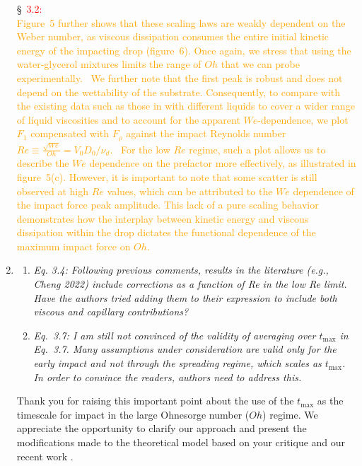 \documentclass[]{article}
\newcommand*\red{\textcolor{red}}
\newcommand{\VS}[1]{{\textcolor{orange}{#1}}}
\begin{document}
\begin{enumerate}
	\S~\red{3.2:}\\
	\VS{Figure~5 further shows that these scaling laws are weakly dependent on the Weber number, as viscous dissipation consumes the entire initial kinetic energy of the impacting drop (figure~6). Once again, we stress that using the water-glycerol mixtures limits the range of $Oh$ that we can probe experimentally. 
	We further note that the first peak is robust and does not depend on the wettability of the substrate. Consequently, to compare with the existing data such as those in \citet{cheng2021drop} with different liquids to cover a wider range of liquid viscosities and to account for the apparent $We$-dependence, we plot $F_1$ compensated with $F_\rho$ against the impact Reynolds number $Re \equiv \frac{\sqrt{We}}{Oh} = V_0D_0/\nu_d$. 
	For the low $Re$ regime, such a plot allows us to describe the $We$ dependence on the prefactor more effectively, as illustrated in figure~5(c). However, it is important to note that some scatter is still observed at high $Re$ values, which can be attributed to the $We$ dependence of the impact force peak amplitude. This lack of a pure scaling behavior demonstrates how the interplay between kinetic energy and viscous dissipation within the drop dictates the functional dependence of the maximum impact force on $Oh$.}
	
	
	\item
	\begin{enumerate}
		\item \textit{Eq. 3.4: Following previous comments, results in the literature (e.g., Cheng 2022) include corrections as a function of Re in the low Re limit. Have the authors tried adding them to their expression to include both viscous and capillary contributions?}
		\item \textit{Eq.~3.7: I am still not convinced of the validity of averaging over $t_{\text{max}}$ in Eq.~3.7. Many assumptions under consideration are valid only for the early impact and not through the spreading regime, which scales as $t_{\text{max}}$. In order to convince the readers, authors need to address this.}
	\end{enumerate}
	
	Thank you for raising this important point about the use of the $t_{\text{max}}$ as the timescale for impact in the large Ohnesorge number ($Oh$) regime. We appreciate the opportunity to clarify our approach and present the modifications made to the theoretical model based on your critique and our recent work \citep{sanjay2024PRL}.
	

\end{enumerate}
\end{document}
